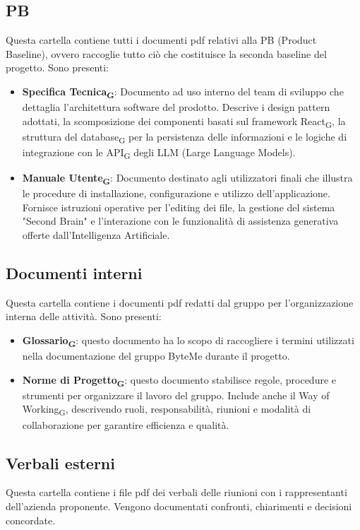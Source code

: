 \documentclass[11pt,a4paper]{article}
\newcommand{\gls}[1]{#1\textsubscript{G}}
\begin{document}
\subsection{PB}
Questa cartella contiene tutti i documenti pdf relativi alla PB (Product Baseline), ovvero raccoglie tutto ciò che costituisce la seconda baseline del progetto. Sono presenti:
\begin{itemize}
    \item \textbf{\gls{Specifica Tecnica}}: Documento ad uso interno del team di sviluppo che dettaglia l'architettura software del prodotto. Descrive i design pattern adottati, la scomposizione dei componenti basati sul framework \gls{React}, la struttura del \gls{database} per la persistenza delle informazioni e le logiche di integrazione con le \gls{API} degli LLM (Large Language Models).
    \item \textbf{\gls{Manuale Utente}}: Documento destinato agli utilizzatori finali che illustra le procedure di installazione, configurazione e utilizzo dell'applicazione. Fornisce istruzioni operative per l'editing dei file, la gestione del sistema "Second Brain" e l'interazione con le funzionalità di assistenza generativa offerte dall'Intelligenza Artificiale.
\end{itemize}


\subsection{Documenti interni}
Questa cartella contiene i documenti pdf redatti dal gruppo per l’organizzazione interna delle attività. Sono presenti:
\begin{itemize}
\item \textbf{\gls{Glossario}}: questo documento ha lo scopo di raccogliere i termini utilizzati nella documentazione del gruppo ByteMe durante il progetto.
\item \textbf{\gls{Norme di Progetto}}: questo documento stabilisce regole, procedure e strumenti per organizzare il lavoro del gruppo. Include anche il \gls{Way of Working}, descrivendo ruoli, responsabilità, riunioni e modalità di collaborazione per garantire efficienza e qualità.
\end{itemize}

\subsection{Verbali esterni}
Questa cartella contiene i file pdf dei verbali delle riunioni con i rappresentanti dell'azienda proponente. Vengono documentati confronti, chiarimenti e decisioni concordate.
\end{document}
